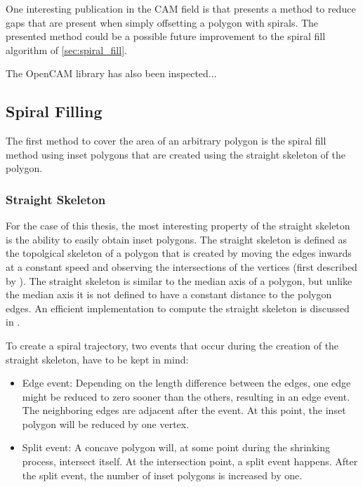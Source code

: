 One interesting publication in the CAM field is \cite{kao1998optimal} that presents a method to reduce gaps that are present when simply offsetting a polygon with spirals. The presented method could be a possible future improvement to the spiral fill algorithm of \autoref{sec:spiral_fill}.

The OpenCAM library has also been inspected...

\subsection{Spiral Filling}

The first method to cover the area of an arbitrary polygon is the spiral fill method using inset polygons that are created using the straight skeleton of the polygon.

\subsubsection{Straight Skeleton}

For the case of this thesis, the most interesting property of the straight skeleton is the ability to easily obtain inset polygons.
The straight skeleton is defined as the topolgical skeleton of a polygon that is created by moving the edges inwards at a constant speed and observing the intersections of the vertices (first described by \citet{Aichholzer:jucs_1_12:a_novel_type_of}). 
The straight skeleton is similar to the median axis of a polygon, but unlike the median axis it is not defined to have a constant distance to the polygon edges. An efficient implementation to compute the straight skeleton is discussed in \citet{huber2010computing}.

To create a spiral trajectory, two events that occur during the creation of the straight skeleton, have to be kept in mind: 

\begin{itemize}
\item Edge event: Depending on the length difference between the edges, one edge might be reduced to zero sooner than the others, resulting in an edge event. The neighboring edges are adjacent after the event. At this point, the inset polygon will be reduced by one vertex.
\item Split event: A concave polygon will, at some point during the shrinking process, intersect itself. At the intersection point, a split event happens. After the split event, the number of inset polygons is increased by one.
\end{itemize}

